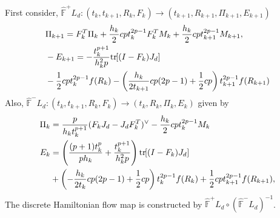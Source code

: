 \documentclass[letterpaper, 10pt, conference]{ieeeconf}
\newcommand{\bracket}[1]{\ensuremath{\left[ #1 \right]}}
\newcommand{\parenth}[1]{\ensuremath{\left( #1 \right)}}
\newcommand{\tr}[1]{\mbox{tr}\ensuremath{\negthickspace\bracket{#1}}}
\begin{document}
First consider, $\hat{\mathbb{F}}^+ L_d: (t_k,t_{k+1},R_k,F_k)\rightarrow(t_{k+1}, R_{k+1}, \Pi_{k+1}, E_{k+1})$
\begin{align*}
&    \Pi_{k+1}  = F_k^T \Pi_k + \frac{h_k}{2} cp t_k^{2p-1} F_k^T M_k +\frac{h_k}{2} cpt^{2p-1}_{k+1} M_{k+1},\\
& -E_{k+1} = -\frac{t^{p+1}_{k}}{h_k^2 p} \tr{(I-F_k)J_d} \\
& - \frac{1}{2}c p t_k^{2p-1} f(R_k)
- \parenth{\frac{h_k}{2t_{k+1}}cp(2p-1)  + \frac{1}{2}c p}       t_{k+1}^{2p-1}  f(R_{k+1})  \\
\end{align*}
Also, $\hat{\mathbb{F}}^- L_d: (t_k,t_{k+1}, R_k, F_k)\rightarrow (t_k, R_k, \Pi_k, E_k)$ given by
\begin{align*}
    \Pi_k & =\frac{p}{h_k t_k^{p+1}} (F_k J_d - J_dF_k^T)^\vee  -\frac{h_k}{2} cp t_k^{2p-1} M_k \\
    E_k & = \parenth{ \frac{(p+1)t_k^p}{p h_k} + \frac{t^{p+1}_{k}}{h_k^2 p} } \tr{(I-F_k)J_d} \\
    & + \parenth{- \frac{h_k}{2 t_k}cp(2p-1) 
        + \frac{1}{2}c p} t_k^{2p-1} f(R_k) + \frac{1}{2}c p t_{k+1}^{2p-1} f(R_{k+1}),\\
\end{align*}
The discrete Hamiltonian flow map is constructed by $\hat{\mathbb{F}}^+L_d \circ (\hat{\mathbb{F}}^-L_d)^{-1}$.



\end{document}
